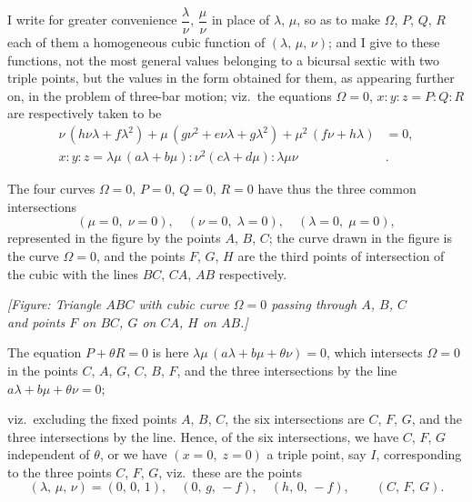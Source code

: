 \documentclass[11pt,a4paper]{book}
\begin{document}
I write for greater convenience $\dfrac{\lambda}{\nu}$, $\dfrac{\mu}{\nu}$ in place of $\lambda$, $\mu$, so as to make $\Omega$, $P$, $Q$, $R$ each of them a homogeneous cubic function of $(\lambda,\,\mu,\,\nu)$; and I give to these functions, not the most general values belonging to a bicursal sextic with two triple points, but the values in the form obtained for them, as appearing further on, in the problem of three-bar motion; viz.\ the equations $\Omega=0$, $x:y:z = P:Q:R$ are respectively taken to be
\begin{align*}
\nu\,(h\nu\lambda + f\lambda^2) + \mu\,(g\nu^2 + e\nu\lambda + g\lambda^2) + \mu^2\,(f\nu + h\lambda) &= 0, \\
x:y:z = \lambda\mu\,(a\lambda+b\mu) : \nu^2(c\lambda+d\mu) : \lambda\mu\nu&.\phantom{=0}
\end{align*}

The four curves $\Omega=0$, $P=0$, $Q=0$, $R=0$ have thus the three common intersections
\[
(\mu=0,\; \nu=0),\quad (\nu=0,\; \lambda=0),\quad (\lambda=0,\; \mu=0),
\]
represented in the figure by the points $A$, $B$, $C$; the curve drawn in the figure is the curve $\Omega=0$, and the points $F$, $G$, $H$ are the third points of intersection of the cubic with the lines $BC$, $CA$, $AB$ respectively.

\begin{center}
\textit{[Figure: Triangle $ABC$ with cubic curve $\Omega=0$ passing through $A$, $B$, $C$\\
and points $F$ on $BC$, $G$ on $CA$, $H$ on $AB$.]}
\end{center}

The equation $P+\theta R=0$ is here $\lambda\mu\,(a\lambda+b\mu+\theta\nu)=0$, which intersects $\Omega=0$ in the points $C$, $A$, $G$, $C$, $B$, $F$, and the three intersections by the line $a\lambda+b\mu+\theta\nu=0$;

\newpage

\noindent
viz.\ excluding the fixed points $A$, $B$, $C$, the six intersections are $C$, $F$, $G$, and the three intersections by the line. Hence, of the six intersections, we have $C$, $F$, $G$ independent of $\theta$, or we have $(x=0,\; z=0)$ a triple point, say $I$, corresponding to the three points $C$, $F$, $G$, viz.\ these are the points
\[
(\lambda,\,\mu,\,\nu) = (0,\,0,\,1),\quad (0,\,g,\,-f),\quad (h,\,0,\,-f), \qquad (C,\,F,\,G).
\]
\end{document}
